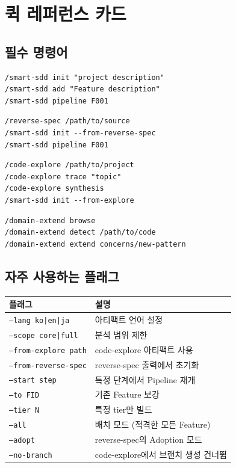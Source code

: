 \documentclass[11pt,a4paper,openright,twoside]{report}
\begin{document}
\chapter{퀵 레퍼런스 카드}
\label{app:quickref}

\section{필수 명령어}

\begin{lstlisting}[title={Greenfield Workflow}]
/smart-sdd init "project description"
/smart-sdd add "Feature description"
/smart-sdd pipeline F001
\end{lstlisting}

\begin{lstlisting}[title={Rebuild Workflow}]
/reverse-spec /path/to/source
/smart-sdd init --from-reverse-spec
/smart-sdd pipeline F001
\end{lstlisting}

\begin{lstlisting}[title={Exploration Workflow}]
/code-explore /path/to/project
/code-explore trace "topic"
/code-explore synthesis
/smart-sdd init --from-explore
\end{lstlisting}

\begin{lstlisting}[title={Domain Extension}]
/domain-extend browse
/domain-extend detect /path/to/code
/domain-extend extend concerns/new-pattern
\end{lstlisting}

\section{자주 사용하는 플래그}

\begin{tabularx}{\textwidth}{lX}
\toprule
\textbf{플래그} & \textbf{설명} \\
\midrule
\texttt{--lang ko|en|ja} & 아티팩트 언어 설정 \\
\texttt{--scope core|full} & 분석 범위 제한 \\
\texttt{--from-explore path} & code-explore 아티팩트 사용 \\
\texttt{--from-reverse-spec} & reverse-spec 출력에서 초기화 \\
\texttt{--start step} & 특정 단계에서 Pipeline 재개 \\
\texttt{--to FID} & 기존 Feature 보강 \\
\texttt{--tier N} & 특정 tier만 빌드 \\
\texttt{--all} & 배치 모드 (적격한 모든 Feature) \\
\texttt{--adopt} & reverse-spec의 Adoption 모드 \\
\texttt{--no-branch} & code-explore에서 브랜치 생성 건너뜀 \\
\bottomrule
\end{tabularx}
\end{document}

